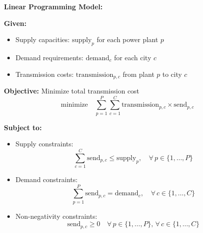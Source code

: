 \documentclass{article}
\begin{document}
\textbf{Linear Programming Model:}

\textbf{Given:}
\begin{itemize}
    \item Supply capacities: $\text{supply}_{p}$ for each power plant $p$
    \item Demand requirements: $\text{demand}_{c}$ for each city $c$
    \item Transmission costs: $\text{transmission}_{p,c}$ from plant $p$ to city $c$
\end{itemize}

\textbf{Objective:} Minimize total transmission cost
\[
\text{minimize} \quad \sum_{p=1}^{P} \sum_{c=1}^{C} \text{transmission}_{p,c} \times \text{send}_{p,c}
\]

\textbf{Subject to:}
\begin{itemize}
    \item Supply constraints: 
    \[
    \sum_{c=1}^{C} \text{send}_{p,c} \leq \text{supply}_{p}, \quad \forall \, p \in \{1, \ldots, P\}
    \]
    \item Demand constraints:
    \[
    \sum_{p=1}^{P} \text{send}_{p,c} = \text{demand}_{c}, \quad \forall \, c \in \{1, \ldots, C\}
    \]
    \item Non-negativity constraints:
    \[
    \text{send}_{p,c} \geq 0 \quad \forall \, p \in \{1, \ldots, P\}, \, \forall \, c \in \{1, \ldots, C\}
    \]
\end{itemize}
\end{document}
